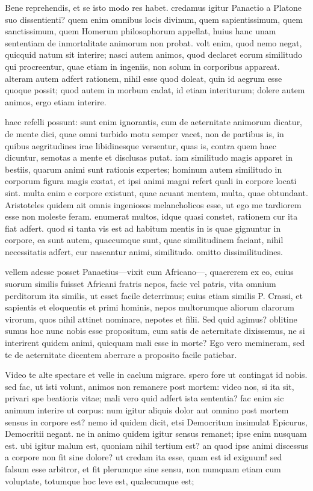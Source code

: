  Bene reprehendis, et se isto modo res habet. credamus igitur Panaetio a Platone suo dissentienti? quem enim omnibus locis divinum, quem sapientissimum, quem sanctissimum, quem Homerum philosophorum appellat, huius hanc unam sententiam de inmortalitate animorum non probat. volt enim, quod nemo negat, quicquid natum sit interire; nasci autem animos, quod declaret eorum similitudo qui procreentur, quae etiam in ingeniis, non solum in corporibus appareat. alteram autem adfert rationem, nihil esse quod doleat, quin id aegrum esse quoque possit; quod autem in morbum cadat, id etiam interiturum; dolere autem animos, ergo etiam interire.

 haec refelli possunt: sunt enim ignorantis, cum de aeternitate animorum dicatur, de mente dici, quae omni turbido motu semper vacet, non de partibus is, in quibus aegritudines irae libidinesque versentur, quas is, contra quem haec dicuntur, semotas a mente et disclusas putat. iam similitudo magis apparet in bestiis, quarum animi sunt rationis expertes; hominum autem similitudo in corporum figura magis exstat, et ipsi animi magni refert quali in corpore locati sint. multa enim e corpore existunt, quae acuant mentem, multa, quae obtundant. Aristoteles quidem ait omnis ingeniosos melancholicos esse, ut ego me tardiorem esse non moleste feram. enumerat multos, idque quasi constet, rationem cur ita fiat adfert. quod si tanta vis est ad habitum mentis in is quae gignuntur in corpore, ea sunt autem, quaecumque sunt, quae similitudinem faciant, nihil necessitatis adfert, cur nascantur animi, similitudo. omitto dissimilitudines.

 vellem adesse posset Panaetius—vixit cum Africano—, quaererem ex eo, cuius suorum similis fuisset Africani fratris nepos, facie vel patris, vita omnium perditorum ita similis, ut esset facile deterrimus; cuius etiam similis P. Crassi, et sapientis et eloquentis et primi hominis, nepos multorumque aliorum clarorum virorum, quos nihil attinet nominare, nepotes et filii. Sed quid agimus? oblitine sumus hoc nunc nobis esse propositum, cum satis de aeternitate dixissemus, ne si interirent quidem animi, quicquam mali esse in morte? Ego vero memineram, sed te de aeternitate dicentem aberrare a proposito facile patiebar.

 Video te alte spectare et velle in caelum migrare. spero fore ut contingat id nobis. sed fac, ut isti volunt, animos non remanere post mortem: video nos, si ita sit, privari spe beatioris vitae; mali vero quid adfert ista sententia? fac enim sic animum interire ut corpus: num igitur aliquis dolor aut omnino post mortem sensus in corpore est? nemo id quidem dicit, etsi Democritum insimulat Epicurus, Democritii negant. ne in animo quidem igitur sensus remanet; ipse enim nusquam est. ubi igitur malum est, quoniam nihil tertium est? an quod ipse animi discessus a corpore non fit sine dolore? ut credam ita esse, quam est id exiguum! sed falsum esse arbitror, et fit plerumque sine sensu, non numquam etiam cum voluptate, totumque hoc leve est, qualecumque est;

